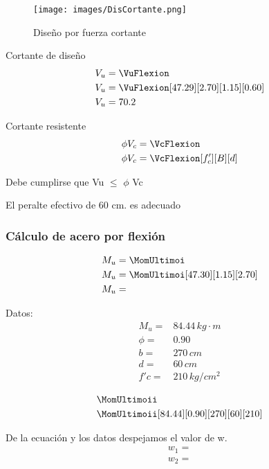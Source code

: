 \begin{figure}[H]
    \centering
    \texttt{[image: images/DisCortante.png]}
    \caption{Diseño por fuerza cortante}
    \label{fig:my_label}
\end{figure}

Cortante de diseño
\begin{align}
	V_u &= \VuFlexion \\
	V_u &= \VuFlexion[47.29][2.70][1.15][0.60] \nonumber \\
	V_u &=  70.2\nonumber
\end{align}

Cortante resistente
\begin{align}
	\phi V_{c} &= \VcFlexion \\
	\phi V_{c} &= \VcFlexion[f'_c][B][d] \nonumber
\end{align}

Debe cumplirse que Vu $\leq$ $\phi$ Vc

El peralte efectivo de 60 cm. es adecuado


\subsubsection{Cálculo de acero por flexión}
\begin{align}
	M_u &= \MomUltimoi \\
	M_u &= \MomUltimoi[47.30][1.15][2.70] \nonumber \\
	M_u &= \nonumber
\end{align}

Datos:
\[
\begin{array}{cc}
    M_u =   &   84.44   \,  kg\cdot m   \\
    \phi =  &   0.90                \\
    b =     &   270     \,  cm      \\
    d =     &   60      \,  cm      \\
    f'c =   &   210     \,  kg/cm^2
\end{array}
\]

\begin{align}
	&\MomUltimoii \\
	&\MomUltimoii[84.44][0.90][270][60][210] \nonumber
\end{align}

De la ecuación y los datos despejamos el valor de w.
\begin{align*}
    w_1 = \\
    w_2 = 
\end{align*}


